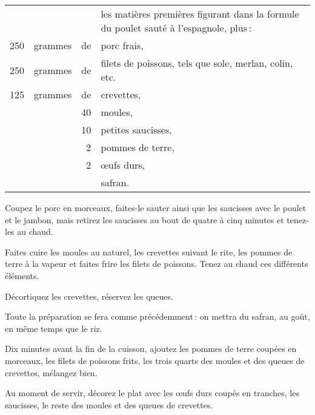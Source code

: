 \footnotesize
\begin{longtable}{rrrp{16em}}
        &         &    & les matières premières figurant dans la formule du poulet sauté
                         à l'espagnole, plus :                                                            \\
    250 & grammes & de & porc frais,                                                                      \\
    250 & grammes & de & filets de poissons, tels que sole, merlan, colin, etc.                           \\
    125 & grammes & de & crevettes,                                                                       \\
        &         & 40 & moules,                                                                          \\
        &         & 10 & petites saucisses,                                                               \\
        &         &  2 & pommes de terre,                                                                 \\
        &         &  2 & œufs durs,                                                                       \\
        &         &    & safran.                                                                          \\
\end{longtable}
\normalsize

Coupez le porc en morceaux, faites-le sauter ainsi que les saucisses avec le
poulet et le jambon, mais retirez les saucisses au bout de quatre à cinq
minutes et tenez-les au chaud.

Faites cuire les moules au naturel, les crevettes suivant le rite, les pommes
de terre à la vapeur et faites frire les filets de poissons. Tenez au chaud ces
différents éléments.

Décortiquez les crevettes, réservez les queues.

Toute la préparation se fera comme précédemment : on mettra du safran, au goût,
en même temps que le riz.

Dix minutes avant la fin de la cuisson, ajoutez les pommes de terre coupées en
morceaux, les filets de poissons frits, les trois quarts des moules et des
queues de crevettes, mélangez bien.

Au moment de servir, décorez le plat avec les œufs durs coupés en tranches,
les saucisses, le reste des moules et des queues de crevettes.

